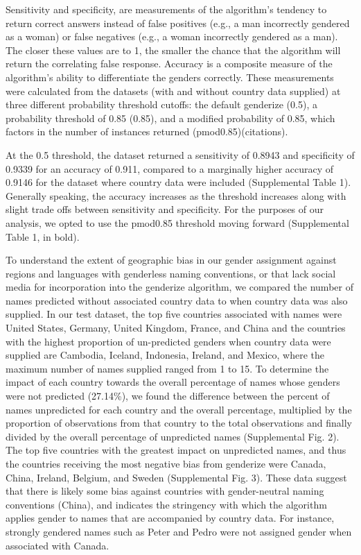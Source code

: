 \documentclass[11pt,]{article}
\begin{document}
Sensitivity and specificity, are measurements of the algorithm's
tendency to return correct answers instead of false positives (e.g., a
man incorrectly gendered as a woman) or false negatives (e.g., a woman
incorrectly gendered as a man). The closer these values are to 1, the
smaller the chance that the algorithm will return the correlating false
response. Accuracy is a composite measure of the algorithm's ability to
differentiate the genders correctly. These measurements were calculated
from the datasets (with and without country data supplied) at three
different probability threshold cutoffs: the default genderize (0.5), a
probability threshold of 0.85 (0.85), and a modified probability of
0.85, which factors in the number of instances returned
(pmod0.85)(citations).

At the 0.5 threshold, the dataset returned a sensitivity of 0.8943 and
specificity of 0.9339 for an accuracy of 0.911, compared to a marginally
higher accuracy of 0.9146 for the dataset where country data were
included (Supplemental Table 1). Generally speaking, the accuracy
increases as the threshold increases along with slight trade offs
between sensitivity and specificity. For the purposes of our analysis,
we opted to use the pmod0.85 threshold moving forward (Supplemental
Table 1, in bold).

To understand the extent of geographic bias in our gender assignment
against regions and languages with genderless naming conventions, or
that lack social media for incorporation into the genderize algorithm,
we compared the number of names predicted without associated country
data to when country data was also supplied. In our test dataset, the
top five countries associated with names were United States, Germany,
United Kingdom, France, and China and the countries with the highest
proportion of un-predicted genders when country data were supplied are
Cambodia, Iceland, Indonesia, Ireland, and Mexico, where the maximum
number of names supplied ranged from 1 to 15. To determine the impact of
each country towards the overall percentage of names whose genders were
not predicted (27.14\%), we found the difference between the percent of
names unpredicted for each country and the overall percentage,
multiplied by the proportion of observations from that country to the
total observations and finally divided by the overall percentage of
unpredicted names (Supplemental Fig. 2). The top five countries with the
greatest impact on unpredicted names, and thus the countries receiving
the most negative bias from genderize were Canada, China, Ireland,
Belgium, and Sweden (Supplemental Fig. 3). These data suggest that there
is likely some bias against countries with gender-neutral naming
conventions (China), and indicates the stringency with which the
algorithm applies gender to names that are accompanied by country data.
For instance, strongly gendered names such as Peter and Pedro were not
assigned gender when associated with Canada.
\end{document}
